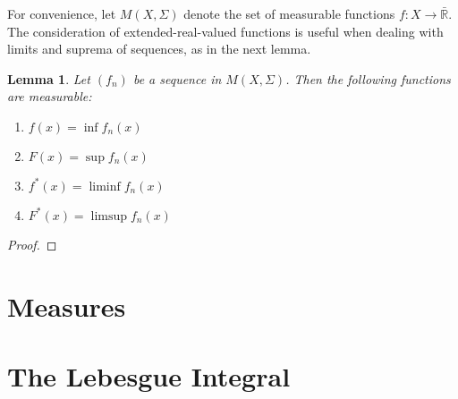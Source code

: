 \documentclass{amsart}
\newcommand{\bbR}{\mathbb{R}}
\newtheorem{lemma}[theorem]{Lemma}
\begin{document}
For convenience, let $M(X, \Sigma)$ denote the set of measurable functions $f: X
\rightarrow \bar{\bbR}$. The consideration of extended-real-valued functions is
useful when dealing with limits and suprema of sequences, as in
the next lemma.

\begin{lemma}
    Let $(f_n)$ be a sequence in $M(X, \Sigma)$. Then the following functions
    are measurable:

    \begin{enumerate}
        \item $f(x) = \inf f_n(x)$
        \item $F(x) = \sup f_n(x)$
        \item $f^*(x) = \liminf f_n(x)$
        \item $F^*(x) = \limsup f_n(x)$
    \end{enumerate}

\end{lemma}

\begin{proof}

\end{proof}




\newpage

\section{Measures}

\newpage

\section{The Lebesgue Integral}
\end{document}
